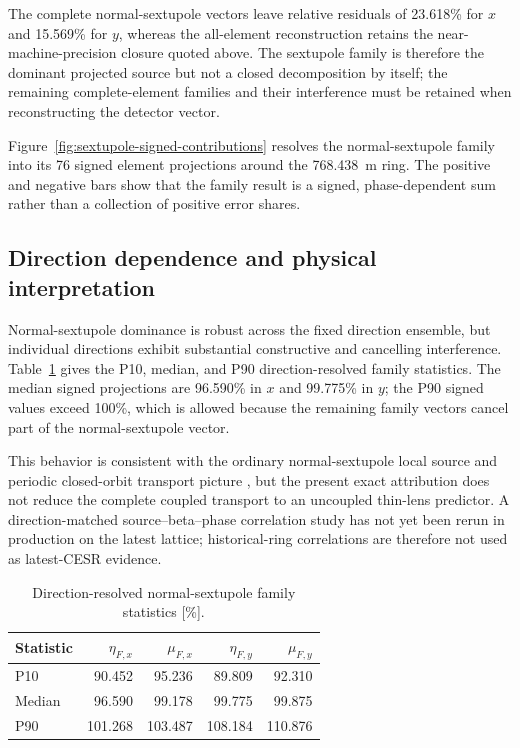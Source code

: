 \documentclass[letterpaper]{jacow}
\begin{document}
The complete normal-sextupole vectors leave relative residuals of 23.618\%
for $x$ and 15.569\% for $y$, whereas the all-element reconstruction retains
the near-machine-precision closure quoted above.  The sextupole family is
therefore the dominant projected source but not a closed decomposition by
itself; the remaining complete-element families and their interference must
be retained when reconstructing the detector vector.

Figure~\ref{fig:sextupole-signed-contributions} resolves the normal-sextupole
family into its 76 signed element projections around the \qty{768.438}{\metre}
ring. The positive and negative bars show that the family result is a signed,
phase-dependent sum rather than a collection of positive error shares.



\subsection{Direction dependence and physical interpretation}

Normal-sextupole dominance is robust across the fixed direction ensemble, but
individual directions exhibit substantial constructive and cancelling
interference. Table~\ref{tab:direction-statistics} gives the P10,
median, and P90 direction-resolved family statistics. The median signed
projections are 96.590\% in $x$ and 99.775\% in $y$; the P90 signed values
exceed 100\%, which is allowed because the remaining family vectors cancel
part of the normal-sextupole vector.

This behavior is consistent with the ordinary normal-sextupole local source
and periodic closed-orbit transport picture \cite{wolski2013,lamont2020}, but
the present exact attribution does not reduce the complete coupled transport
to an uncoupled thin-lens predictor. A direction-matched source--beta--phase
correlation study has not yet been rerun in production on the latest lattice;
historical-ring correlations are therefore not used as latest-CESR evidence.

\begin{table}[!htb]
  \centering
  \caption{Direction-resolved normal-sextupole family statistics [\%].}
  \scriptsize
  \setlength{\tabcolsep}{3.3pt}
  \begin{tabular}{@{}lrrrr@{}}
    \toprule
    \textbf{Statistic} & $\eta_{F,x}$ & $\mu_{F,x}$ & $\eta_{F,y}$ & $\mu_{F,y}$ \\
    \midrule
    P10    & 90.452 & 95.236 & 89.809 & 92.310 \\
    Median & 96.590 & 99.178 & 99.775 & 99.875 \\
    P90    & 101.268 & 103.487 & 108.184 & 110.876 \\
    \bottomrule
  \end{tabular}
  \label{tab:direction-statistics}
\end{table}
\end{document}
